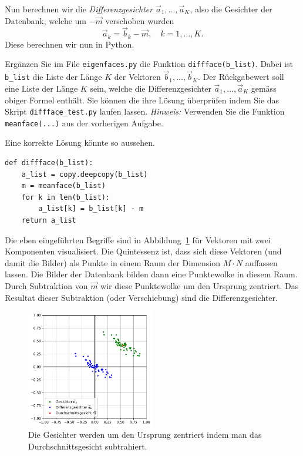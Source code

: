 Nun berechnen wir die \textit{Differenzgesichter} $\vec a_1,\ldots,\vec a_K$, also die Gesichter der Datenbank, welche um $-\vec{m}$ verschoben wurden
\begin{equation*}
	\vec a_k=\vec b_k-\vec m,\quad k=1,\ldots,K.
\end{equation*}
Diese berechnen wir nun in Python.
\begin{aufgabe} \label{aufg:diffface}
	Ergänzen Sie im File \texttt{eigenfaces.py} die Funktion \texttt{diffface(b\_list)}.
	Dabei ist \texttt{b\_list} die Liste der Länge $K$ der Vektoren $\vec b_1,\ldots,\vec b_K$.
	Der Rückgabewert soll eine Liste der Länge $K$ sein, welche die Differenzgesichter $\vec a_1,\ldots,\vec a_K$ gemäss obiger Formel enthält.
	Sie können die ihre Lösung überprüfen indem Sie das Skript \texttt{diffface\_test.py} laufen lassen.
	\textit{Hinweis:} Verwenden Sie die Funktion \texttt{meanface(...)} aus der vorherigen Aufgabe.
\end{aufgabe}
\begin{losung}
	Eine korrekte Lösung könnte so aussehen.
\begin{lstlisting}[style=python]
def diffface(b_list):
	a_list = copy.deepcopy(b_list)
	m = meanface(b_list)
	for k in len(b_list):
		a_list[k] = b_list[k] - m
	return a_list
\end{lstlisting}
\end{losung}
Die eben eingeführten Begriffe sind in Abbildung~\ref{fig:meandiff} für Vektoren mit zwei Komponenten visualisiert.
Die Quintessenz ist, dass sich diese Vektoren (und damit die Bilder) als Punkte in einem Raum der Dimension $M\cdot N$ auffassen lassen.
Die Bilder der Datenbank bilden dann eine \glqq{}Punktewolke\grqq{} in diesem Raum.
Durch Subtraktion von $\vec m$ wir diese Punktewolke um den Ursprung zentriert.
Das Resultat dieser Subtraktion (oder Verschiebung) sind die Differenzgesichter.
\begin{figure}[ht]
	\centering
	\includegraphics[width=0.5\textwidth]{images/facespace/meandiff}
	\caption{Die Gesichter werden um den Ursprung zentriert indem man das Durchschnittsgesicht subtrahiert.}
	\label{fig:meandiff}
\end{figure}
